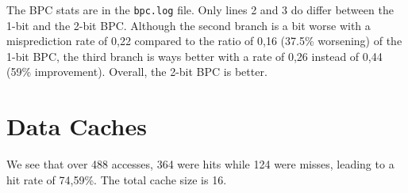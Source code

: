 \documentclass[a4paper]{report}
\begin{document}
The BPC stats are in the \texttt{bpc.log} file. Only lines 2 and 3 do differ between the 1-bit and the 2-bit
BPC. Although the second branch is a bit worse with a misprediction rate of 0,22 compared to the ratio of 0,16
(37.5\% worsening) of the 1-bit BPC, the third branch is ways better with a rate of 0,26 instead of 0,44
(59\% improvement). Overall, the 2-bit BPC is better.


\section{Data Caches}

We see that over 488 accesses, 364 were hits while 124 were misses, leading to a hit rate of 74,59\%. The
total cache size is 16.
\end{document}
